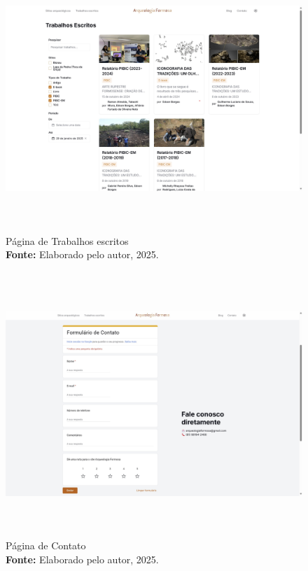 
\begin{figure}[H]
    \centering
    \includegraphics[height=10cm, keepaspectratio]{img/site/Trabalhos escritos.jpg}
    \caption{Página de Trabalhos escritos \\
    \textbf{Fonte:} Elaborado pelo autor, 2025.}
    \label{fig:pagina_trabalhos}
\end{figure}


\begin{figure}[H]
    \centering
    \includegraphics[height=10cm, keepaspectratio]{img/site/contato.jpg}
    \caption{Página de Contato \\
    \textbf{Fonte:} Elaborado pelo autor, 2025.}
    \label{fig:pagina_contato}
\end{figure}


